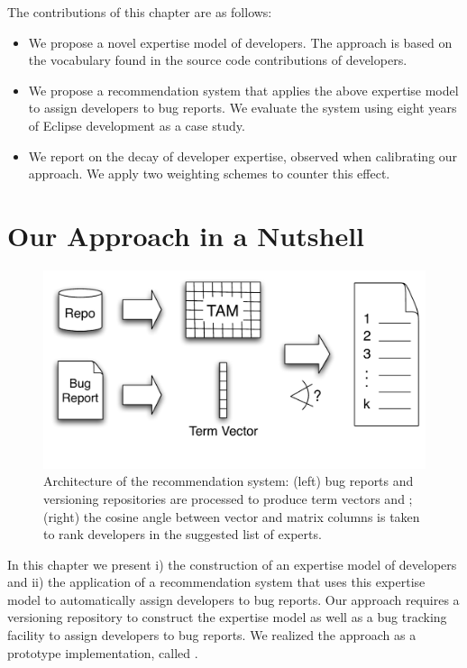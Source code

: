 The contributions of this chapter are as follows:
\begin{itemize}
\item We propose a novel expertise model of developers. The approach is based on the vocabulary found in the source code contributions of developers.

\item We propose a recommendation system that applies the above expertise model to assign developers to bug reports. We evaluate the system using eight years of Eclipse development as a case study. 

\item We report on the decay of developer expertise, observed when calibrating our approach. We apply two weighting schemes to counter this effect.
\end{itemize}

\section{Our Approach in a Nutshell}\label{sec:nutshell}

\begin{figure}
    \includegraphics[width=\linewidth]{fig/devlect-pipeline}
    \caption{Architecture of the \DEVLECT recommendation system: (left) bug reports and versioning repositories are processed to produce term vectors and \TAMS; (right) the cosine angle between vector and matrix columns is taken to rank developers in the suggested list of experts.}
    \label{fig:algo}
\end{figure} 

In this chapter we present i) the construction of an expertise model of developers and ii) the application of a recommendation system that uses this expertise model to automatically assign developers to bug reports. Our approach requires a versioning repository to construct the expertise model as well as a bug tracking facility to assign developers to bug reports. We realized the approach as a prototype implementation, called \DEVLECT.

